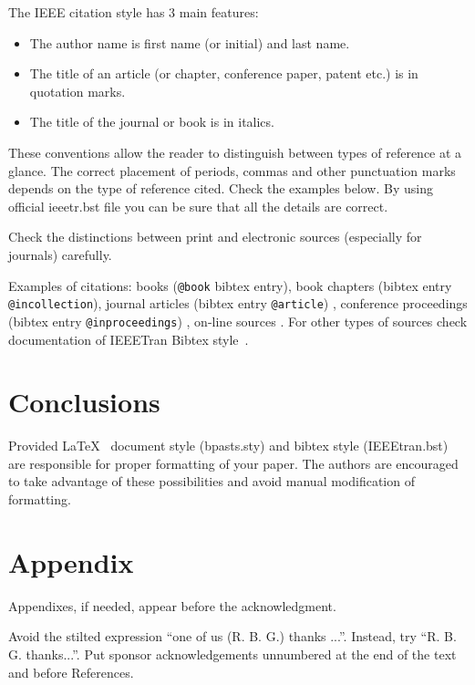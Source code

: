 \documentclass[10pt,twoside,twocolumn,a4paper]{article}
\begin{document}
The IEEE citation style has 3 main features:
\begin{itemize}
\item The author name is first name (or initial) and last name.
\item The title of an article (or chapter, conference paper, patent etc.) is in quotation marks.
\item The title of the journal or book is in italics.
\end{itemize}

These conventions allow the reader to distinguish between types of reference at a glance. The correct placement of periods, commas and other punctuation marks depends on the type of reference cited. Check the examples below. By using official ieeetr.bst file you can be sure that all the details are correct.

Check the distinctions between print and electronic sources (especially for journals) carefully.

Examples of citations: 
books (\verb+@book+ bibtex entry)\cite{kazmierkowski1994automatic}\cite{wilamowski2018power},
book chapters (bibtex entry \verb+@incollection+)\cite{urry2016photosynthesis}\cite{kazmierkowski2011control},
journal articles (bibtex entry \verb+@article+) \cite{mann1999northern}\cite{kaczorek2005generalization}\cite{stando2020constant}, 
conference proceedings (bibtex entry \verb+@inproceedings+)  \cite{lizotte2016multi}\cite{kocsis2006uct},
on-line sources \cite{gelly2012grand}\cite{zotero_zotero_2018}\cite{ieeetranbst}.
For other types of sources check documentation of IEEETran Bibtex style~\cite{ieeetranbst}.


\section{Conclusions}

Provided \LaTeX~ document style (bpasts.sty) and bibtex style (IEEEtran.bst) are responsible for proper formatting of your paper. The authors are encouraged to take advantage of these possibilities and avoid manual modification of formatting.

\section*{Appendix}
Appendixes, if needed, appear before the acknowledgment.

\begin{acknowledgements}
Avoid the stilted expression “one of us (R. B. G.) thanks ...”.  Instead, try “R. B. G. thanks...”. Put sponsor acknowledgements unnumbered at the end of the text and before References.
\end{acknowledgements}

%
%
%



\end{document}
